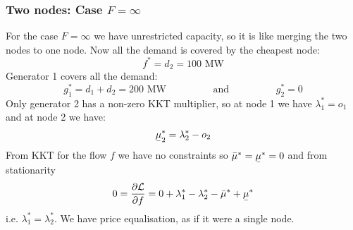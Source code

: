 \documentclass[10pt,aspectratio=169,dvipsnames]{beamer}
\def\l{\lambda}
\def\m{\mu}
\def\d{\partial}
\def\cL{\mathcal{L}}
\newcommand{\ubar}[1]{\text{\b{$#1$}}}
\begin{document}
\begin{frame}[fragile]
  \frametitle{Two nodes: Case $F = \infty$ }

  For the case $F = \infty$ we have unrestricted capacity, so it is
  like merging the two nodes to one node. Now all the demand is
  covered by the cheapest node:
  \begin{equation*}
    f^* = d_2 = 100\textrm{ MW}
  \end{equation*}
  Generator 1 covers all the demand:
  \begin{equation*}
    g_1^* = d_1+d_2  = 200\textrm{ MW} \hspace{2cm} \textrm{and} \hspace{2cm} g_2^* = 0
  \end{equation*}
  Only generator 2 has a non-zero KKT multiplier, so at node 1 we have
  $\l_1^* =o_1$ and at node 2 we have:
  \begin{equation*}
   \ubar{\m}_2^* = \l_2^* - o_2
  \end{equation*}
  From KKT for the flow $f$ we have no constraints so $\bar{\m}^* = \ubar{\m}^* = 0$ and from stationarity
  \begin{equation*}
    0 = \frac{\d \cL}{\d f} = 0 +  \l_1^* - \l_2^*  -  \bar{\m}^* + \ubar{\m}^*
  \end{equation*}
  i.e. $\l_1^* = \l_2^*$. We have price equalisation, as if it were a single node.

\end{frame}
\end{document}
